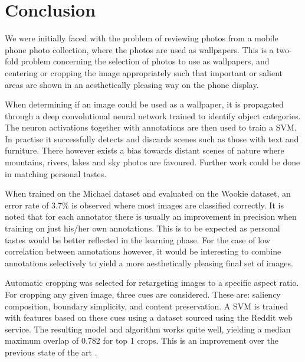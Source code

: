 %

\chapter{Conclusion}

We were initially faced with the problem of reviewing photos from a mobile phone
photo collection, where the photos are used as wallpapers.
This is a two-fold problem concerning the selection of photos to use as
wallpapers, and centering or cropping the image appropriately such that
important or salient areas are shown in an aesthetically pleasing way on the
phone display.

When determining if an image could be used as a wallpaper, it is propagated
through a deep convolutional neural network trained to identify object
categories.
The neuron activations together with annotations are then used to train a SVM.
In practise it successfully detects and discards scenes such as those with text and furniture.
There however exists a bias towards distant scenes of nature where mountains, rivers, lakes and sky photos are favoured.
Further work could be done in matching personal tastes.

When trained on the Michael dataset and evaluated on the Wookie dataset, an
error rate of 3.7\% is observed where most images are classified correctly.
It is noted that for each annotator there is usually an improvement in precision
when training on just his/her own annotations.
This is to be expected as personal tastes would be better reflected in the
learning phase.
For the case of low correlation between annotations however, it would be
interesting to combine annotations selectively to yield a more aesthetically
pleasing final set of images.

Automatic cropping was selected for retargeting images to a specific aspect
ratio.
For cropping any given image, three cues are considered.
These are: saliency composition, boundary simplicity, and content preservation.
A SVM is trained with features based on these cues using a dataset sourced using
the Reddit web service.
The resulting model and algorithm works quite well, yielding a median maximum
overlap of 0.782 for top 1 crops.
This is an improvement over the previous state of the art \cite{fang2014automatic}.

